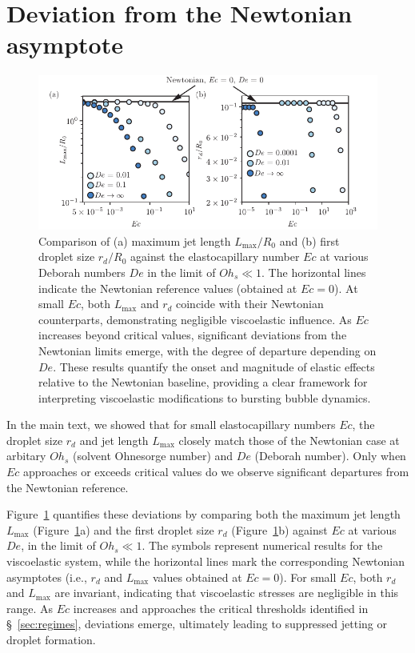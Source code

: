 \documentclass{jfm}
\newcommand{\oo}{\color{magenta} \normalfont}
\newcommand{\bb}{\color{black} \normalfont}
\begin{document}
\section{Deviation from the Newtonian asymptote}\label{app:devNewt}
\renewcommand{\thefigure}{\Alph{section}\,\arabic{figure}}
\setcounter{figure}{0}
\begin{figure}
    \centering
    \includegraphics[width=\textwidth]{Figures/LMaxRd-eps-converted-to.pdf}
    \caption{{\oo Comparison of (a) maximum jet length $L_{\text{max}}/R_0$ and (b) first droplet size $r_d/R_0$ against the elastocapillary number $Ec$ at various Deborah numbers $De$ in the limit of $Oh_s \ll 1$. The horizontal lines indicate the Newtonian reference values (obtained at $Ec=0$). At small $Ec$, both $L_{\text{max}}$ and $r_d$ coincide with their Newtonian counterparts, demonstrating negligible viscoelastic influence. As $Ec$ increases beyond critical values, significant deviations from the Newtonian limits emerge, with the degree of departure depending on $De$. These results quantify the onset and magnitude of elastic effects relative to the Newtonian baseline, providing a clear framework for interpreting viscoelastic modifications to bursting bubble dynamics.\bb}}
    \label{fig:devNewt}
\end{figure}

In the main text, we showed that for small elastocapillary numbers $Ec$, the droplet size $r_d$ and jet length $L_{\text{max}}$ closely match those of the Newtonian case at arbitary $Oh_s$ (solvent Ohnesorge number) and $De$ (Deborah number). Only when $Ec$ approaches or exceeds critical values do we observe significant departures from the Newtonian reference.

Figure~\ref{fig:devNewt} quantifies these deviations by comparing both the maximum jet length $L_{\text{max}}$ (Figure~\ref{fig:devNewt}a) and the first droplet size $r_d$ (Figure~\ref{fig:devNewt}b) against $Ec$ at various $De$, in the limit of $Oh_s \ll 1$. The symbols represent numerical results for the viscoelastic system, while the horizontal lines mark the corresponding Newtonian asymptotes (i.e., $r_d$ and $L_{\text{max}}$ values obtained at $Ec=0$). For small $Ec$, both $r_d$ and $L_{\text{max}}$ are invariant, indicating that viscoelastic stresses are negligible in this range. As $Ec$ increases and approaches the critical thresholds identified in \S~\ref{sec:regimes}, deviations emerge, ultimately leading to suppressed jetting or droplet formation.
\end{document}
